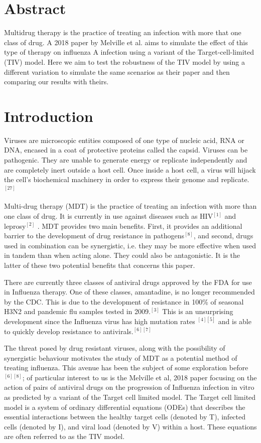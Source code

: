 \documentclass[a4paper,11pt]{article}
\begin{document}
\section*{Abstract}
Multidrug therapy is the practice of treating an infection with more that one class of drug. A 2018 paper by Melville et al. aims to simulate the effect of this type of therapy on influenza A infection using a variant of the Target-cell-limited (TIV) model. Here we aim to test the robustness of the TIV model by using a different variation to simulate the same scenarios as their paper and then comparing our results with theirs.
\section*{Introduction}
Viruses are microscopic entities composed of one type of nucleic acid, RNA or DNA, encased in a coat of protective proteins called the capsid. Viruses can be pathogenic. They are unable to generate energy or replicate independently and are completely inert outside a host cell. Once inside a host cell, a virus will hijack the cell's biochemical machinery in order to express their genome and replicate.$^{[27]}$

Multi-drug therapy (MDT) is the practice of treating an infection with more than one class of drug. It is currently in use against diseases such as HIV$^{[1]}$ and leprosy$^{[2]}$ . MDT provides two main benefits. First, it provides an additional barrier to the development of drug resistance in pathogens$^{[8]}$, and second, drugs used in combination can be synergistic, i.e. they may be more effective when used in tandem than when acting alone. They could also be antagonistic. It is the latter of these two potential benefits that concerns this paper.

There are currently three classes of antiviral drugs approved by the FDA for use in Influenza therapy. One of these classes, amantadine, is no longer recommended by the CDC. This is due to the development of resistance in 100\% of seasonal H3N2 and pandemic flu samples tested in 2009.$^{[3]}$ This is an unsurprising development since the Influenza virus has high mutation rates $^{[4][5]}$ and is able to quickly develop resistance to antivirals.$^{[6][7]}$

The threat posed by drug resistant viruses, along with the possibility of synergistic behaviour motivates the study of MDT as a potential method of treating influenza. This avenue has been the subject of some exploration before$^{[6][8]}$; of particular interest to us is the Melville et al, 2018 paper focusing on the action of pairs of antiviral drugs on the progression of Influenza infection in vitro as predicted by a variant of the Target cell limited model. The Target cell limited model is a system of ordinary differential equations (ODEs) that describes the essential interactions between the healthy target cells (denoted by T), infected cells (denoted by I), and viral load (denoted by V) within a host. These equations are often referred to as the TIV model.
\end{document}
